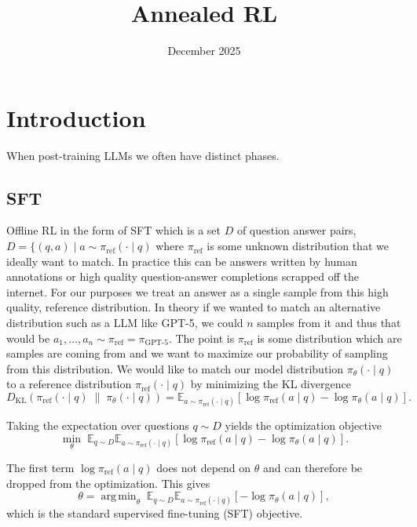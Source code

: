 \documentclass{article}
\title{Annealed RL}
\date{December 2025}
\DeclareMathOperator*{\argmin}{arg\,min}
\begin{document}
\maketitle

\section{Introduction}

When post-training LLMs we often have distinct phases. 

\subsection{SFT}
Offline RL in the form of SFT which is a set $D$ of question answer pairs, $D = \{ (q,a) \mid a \sim \pi_{\text{ref}}(\cdot \mid q)$ where $\pi_{\text{ref}}$ is some unknown distribution that we ideally want to match. In practice this can be answers written by human annotations or high quality question-answer completions scrapped off the internet. For our purposes we treat an answer as a single sample from this high quality, reference distribution. In theory if we wanted to match an alternative distribution such as a LLM like GPT-5, we could $n$ samples from it and thus that would be $a_1, \ldots, a_n \sim \pi_{\text{ref}} = \pi_{\text{GPT-5}}$. The point is $\pi_{\text{ref}}$ is some distribution which are samples are coming from and we want to maximize our probability of sampling from this distribution. We would like to match our model distribution $\pi_\theta(\cdot \mid q)$ to a
reference distribution $\pi_{\text{ref}}(\cdot \mid q)$ by minimizing the KL
divergence
\begin{equation}
D_{\mathrm{KL}}\!\left(
\pi_{\text{ref}}(\cdot \mid q)
\;\middle\|\;
\pi_\theta(\cdot \mid q)
\right)
=
\mathbb{E}_{a \sim \pi_{\text{ref}}(\cdot \mid q)}
\left[
\log \pi_{\text{ref}}(a \mid q)
-
\log \pi_\theta(a \mid q)
\right].
\end{equation}

Taking the expectation over questions $q \sim D$ yields the optimization
objective
\begin{equation}
\min_\theta \;
\mathbb{E}_{q \sim D}
\mathbb{E}_{a \sim \pi_{\text{ref}}(\cdot \mid q)}
\left[
\log \pi_{\text{ref}}(a \mid q)
-
\log \pi_\theta(a \mid q)
\right].
\end{equation}

The first term $\log \pi_{\text{ref}}(a \mid q)$ does not depend on $\theta$ and
can therefore be dropped from the optimization. This gives
\begin{equation}
\theta
=
\argmin_\theta
\;
\mathbb{E}_{q \sim D}
\mathbb{E}_{a \sim \pi_{\text{ref}}(\cdot \mid q)}
\left[
- \log \pi_\theta(a \mid q)
\right],
\end{equation}
which is the standard supervised fine-tuning (SFT) objective.
\end{document}
